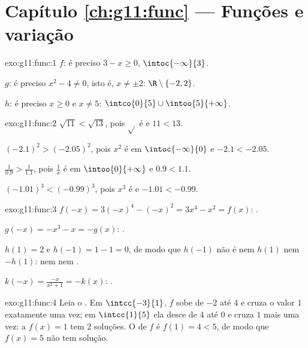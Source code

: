 \section*{Capítulo \ref{ch:g11:func} --- Funções e variação}

\begin{solution}{exo:g11:func:1}
$f$: é preciso $3 - x \geq 0$,  $\intoc{-\infty}{3}$.

$g$: é preciso $x^2 - 4 \neq 0$, isto é, $x \neq \pm 2$: 
$\R \setminus \{-2, 2\}$.

$h$: é preciso $x \geq 0$ e $x \neq 5$: 
$\intco{0}{5} \cup \intoo{5}{+\infty}$.
\end{solution}

\begin{solution}{exo:g11:func:2}
$\sqrt{11} < \sqrt{13}$, pois $\sqrt{}$ é  e $11 < 13$.

$(-2.1)^2 > (-2.05)^2$, pois $x^2$ é  em
$\intoc{-\infty}{0}$ e $-2.1 < -2.05$.

$\frac{1}{0.9} > \frac{1}{1.1}$, pois $\frac1x$ é  em
$\intoo{0}{+\infty}$ e $0.9 < 1.1$.

$(-1.01)^3 < (-0.99)^3$, pois $x^3$ é  e $-1.01 < -0.99$.
\end{solution}

\begin{solution}{exo:g11:func:3}
$f(-x) = 3(-x)^4 - (-x)^2 = 3x^4 - x^2 = f(x)$: .

$g(-x) = -x^3 - x = -g(x)$: .

$h(1) = 2$ e $h(-1) = 1 - 1 = 0$, de modo que $h(-1)$ não é nem $h(1)$
nem $-h(1)$: nem  nem .

$k(-x) = \frac{-x}{x^2+1} = -k(x)$: .
\end{solution}

\begin{solution}{exo:g11:func:4}
Leia o . Em $\intcc{-3}{1}$, $f$ sobe de $-2$ até $4$ e
cruza o valor $1$ exatamente uma vez; em $\intcc{1}{5}$ ela desce de $4$
até $0$ e cruza $1$ mais uma vez: a  $f(x) = 1$ tem $2$ soluções.
O  de $f$ é $f(1) = 4 < 5$, de modo que $f(x) = 5$ não tem
solução.
\end{solution}

